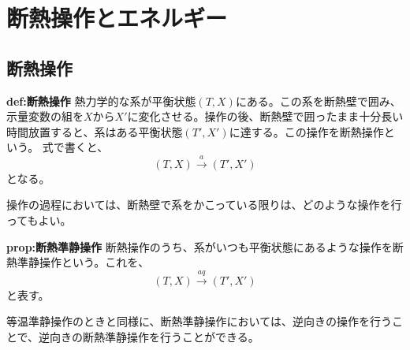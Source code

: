\documentclass[a4paper,11pt]{jsarticle}
\begin{document}
\section{断熱操作とエネルギー}
\subsection{断熱操作}
\begin{itembox}[l]{\textbf{def:断熱操作}}
    熱力学的な系が平衡状態$(T,X)$にある。この系を断熱壁で囲み、示量変数の組を$X$から$X'$に変化させる。操作の後、断熱壁で囲ったまま十分長い時間放置すると、系はある平衡状態$(T',X')$に達する。この操作を断熱操作という。
    式で書くと、
    \begin{equation}
        (T,X) \xrightarrow{a} (T',X')
    \end{equation}
    となる。
\end{itembox}
操作の過程においては、断熱壁で系をかこっている限りは、どのような操作を行ってもよい。\\

\begin{itembox}[l]{\textbf{prop:断熱準静操作}}
    断熱操作のうち、系がいつも平衡状態にあるような操作を断熱準静操作という。これを、
    \begin{equation}
        (T,X) \xrightarrow{aq} (T',X')
    \end{equation}
    と表す。
\end{itembox}
等温準静操作のときと同様に、断熱準静操作においては、逆向きの操作を行うことで、逆向きの断熱準静操作を行うことができる。\\
\end{document}

